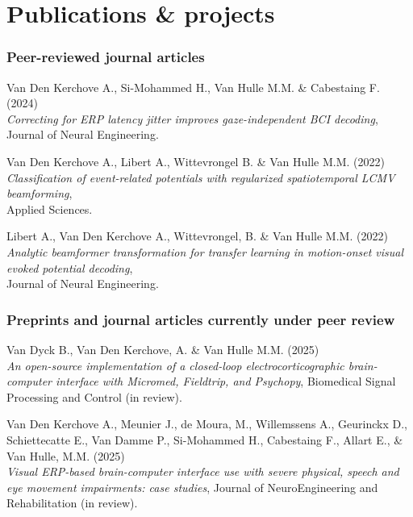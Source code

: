 \documentclass{resume}
\begin{document}
\section*{Publications \& projects}


\subsubsection*{Peer-reviewed journal articles}
\begin{description}
	\item  Van Den Kerchove A., Si-Mohammed H., Van Hulle M.M. \& Cabestaing F. (2024) \\
	      \emph{Correcting for ERP latency jitter improves gaze-independent BCI decoding}, \\
	      Journal of Neural Engineering.
	\item Van Den Kerchove A., Libert A., Wittevrongel B. \& Van Hulle M.M.  (2022) \\
	      \emph{Classification of event-related potentials with regularized spatiotemporal LCMV beamforming}, \\
	      Applied Sciences.
	\item Libert A., Van Den Kerchove A., Wittevrongel, B. \& Van Hulle M.M. (2022) \\
	      \emph{Analytic beamformer transformation for transfer learning in motion-onset visual evoked potential decoding}, \\
	      Journal of Neural Engineering.
\end{description}

\subsubsection*{Preprints and journal articles currently under peer review}
\begin{description}
	\item Van Dyck B., Van Den Kerchove, A. \& Van Hulle M.M. (2025)\\
	      \emph{An open-source implementation of a closed-loop electrocorticographic
		      brain-computer interface with Micromed, Fieldtrip, and Psychopy},
	      Biomedical Signal Processing and Control (in review).
	\item Van Den Kerchove A., Meunier J., de Moura, M., Willemssens A., Geurinckx D., Schiettecatte E., Van Damme P., Si-Mohammed H., Cabestaing F., Allart E., \& Van Hulle, M.M. (2025)\\
	      \emph{Visual ERP-based brain-computer interface use with severe physical, speech and eye movement impairments: case studies},
	      Journal of NeuroEngineering and Rehabilitation (in review).
\end{description}
\end{document}
